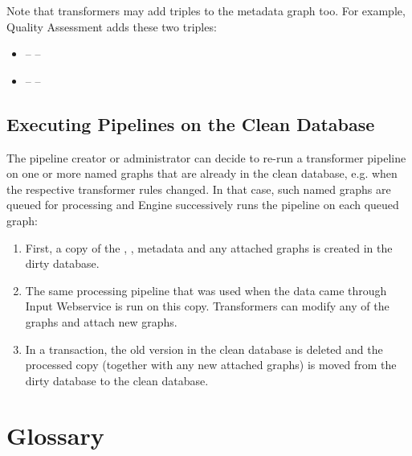 Note that transformers may add triples to the metadata graph too. For example, Quality Assessment adds these two triples:
\begin{itemize}
  \item {} --  -- 
  \item {} --  -- 
\end{itemize}

\section{Executing Pipelines on the Clean Database}
\label{sec:pipelinesOnCleanDB}

The pipeline creator or administrator  can decide to re-run a transformer pipeline on one or more named graphs that are already in the clean database, e.g. when the respective transformer rules changed. In that case, such named graphs are queued for processing and Engine successively runs the pipeline on each queued graph:

\begin{enumerate}
  \item First, a copy of the , , metadata and any attached graphs is created in the dirty database.
  \item The same processing pipeline that was used when the data came through Input Webservice is run on this copy. Transformers can modify any of the graphs and attach new graphs.
  \item In a transaction, the old version in the clean database is deleted and the processed copy (together with any new attached graphs) is moved from the dirty database to the clean database.
\end{enumerate}

\appendix

\chapter{Glossary}

